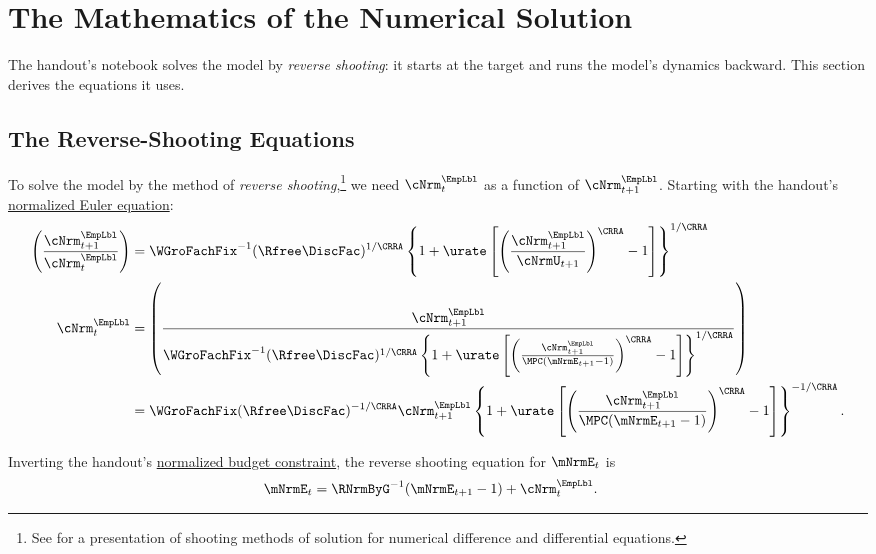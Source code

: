 \documentclass{econark}
\begin{document}
\section{The Mathematics of the Numerical Solution}\label{sec:NumericalSolution}

The handout's notebook solves the model by {\it reverse shooting}: it starts at the target and runs the model's dynamics backward.  This section derives the equations it uses.

\subsection{The Reverse-Shooting Equations}\label{sec:TractableBufferStock-ReverseShooting}

To solve the model by the method of {\it reverse shooting},\footnote{See \cite{judd:book} for a presentation of shooting methods of solution for numerical difference and differential equations.} we need ${\cNrm}^{\EmpLbl}_{t}$ as a function
of ${\cNrm}^{\EmpLbl}_{t+1}$.  Starting with the handout's \hyperref[eq:BeforePFStep]{normalized Euler equation}:
\begin{equation}\begin{gathered}\begin{aligned}
         \left(\frac{{\cNrm}^{\EmpLbl}_{t+1}}{{\cNrm}^{\EmpLbl}_{t}}\right) & =  \WGroFachFix^{-1} (\Rfree\DiscFac)^{1/\CRRA} \left\{1+\urate\left[\left(\frac{{\cNrm}^{\EmpLbl}_{t+1}}{\cNrmU_{t+1}}\right)^{\CRRA}-1\right]\right\}^{1/\CRRA}
\\       {\cNrm}^{\EmpLbl}_{t} & =  \left(\frac{{\cNrm}^{\EmpLbl}_{t+1}}{\WGroFachFix^{-1} (\Rfree\DiscFac)^{1/\CRRA} \left\{1+\urate\left[\left(\frac{{\cNrm}^{\EmpLbl}_{t+1}}{\MPC (\mNrmE_{t+1}-1)}\right)^{\CRRA}-1\right]\right\}^{1/\CRRA} }  \right)
\\        & =  \WGroFachFix (\Rfree\DiscFac)^{-1/\CRRA} {\cNrm}^{\EmpLbl}_{t+1}\left\{1+\urate\left[\left(\frac{{\cNrm}^{\EmpLbl}_{t+1}}{\MPC (\mNrmE_{t+1}-1)}\right)^{\CRRA}-1\right]\right\}^{-1/\CRRA}        \label{eq:cReverse}.
\end{aligned}\end{gathered}\end{equation}

Inverting the handout's \hyperref[eq:metp1]{normalized budget constraint}, the reverse shooting equation for $\mNrmE_{t}$ is
\begin{equation}\begin{gathered}\begin{aligned}
        \mNrmE_{t} & =  \RNrmByG^{-1} (\mNrmE_{t+1}-1)+{\cNrm}^{\EmpLbl}_{t} . \label{eq:mReverse}
\end{aligned}\end{gathered}\end{equation}
\end{document}
